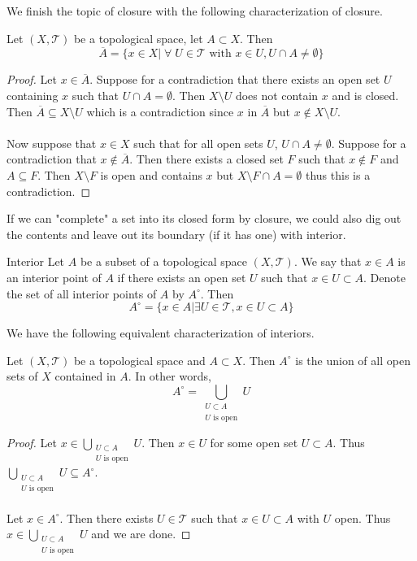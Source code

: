 We finish the topic of closure with the following characterization of closure. 

\begin{thm}{}{} Let $(X,\mathcal{T})$ be a topological space, let $A\subset X$. Then $$\overline{A}=\{x\in X|\;\forall\;U\in\mathcal{T}\text{ with }x\in U,U\cap A\neq\emptyset\}$$ \tcbline
\begin{proof}
Let $x\in\overline{A}$. Suppose for a contradiction that there exists an open set $U$ containing $x$ such that $U\cap A=\emptyset$. Then $X\setminus U$ does not contain $x$ and is closed. Then $\overline{A}\subseteq X\setminus U$ which is a contradiction since $x$ in $\overline{A}$ but $x\notin X\setminus U$. \\~\\
Now suppose that $x\in X$ such that for all open sets $U$, $U\cap A\neq\emptyset$. Suppose for a contradiction that $x\notin\overline{A}$. Then there exists a closed set $F$ such that $x\notin F$ and $A\subseteq F$. Then $X\setminus F$ is open and contains $x$ but $X\setminus F\cap A=\emptyset$ thus this is a contradiction. 
\end{proof}
\end{thm}

If we can "complete" a set into its closed form by closure, we could also dig out the contents and leave out its boundary (if it has one) with interior. 

\begin{defn}{Interior}{} Let $A$ be a subset of a topological space $(X,\mathcal{T})$. We say that $x\in A$ is an interior point of $A$ if there exists an open set $U$ such that $x\in U\subset A$. Denote the set of all interior points of $A$ by $A^\circ$. Then $$A^\circ=\{x\in A|\exists U\in\mathcal{T},x\in U\subset A\}$$
\end{defn}

We have the following equivalent characterization of interiors. 

\begin{prp}{}{} Let $(X,\mathcal{T})$ be a topological space and $A\subset X$. Then $A^\circ$ is the union of all open sets of $X$ contained in $A$. In other words, $$A^\circ=\bigcup_{\substack{U\subset A\\U\text{ is open}}}U$$\tcbline
\begin{proof}
Let $x\in\bigcup_{\substack{U\subset A\\U\text{ is open}}}U$. Then $x\in U$ for some open set $U\subset A$. Thus $\bigcup_{\substack{U\subset A\\U\text{ is open}}}U\subseteq A^\circ$. \\~\\
Let $x\in A^\circ$. Then there exists $U\in\mathcal{T}$ such that $x\in U\subset A$ with $U$ open. Thus $x\in\bigcup_{\substack{U\subset A\\U\text{ is open}}}U$ and we are done. 
\end{proof}
\end{prp}

